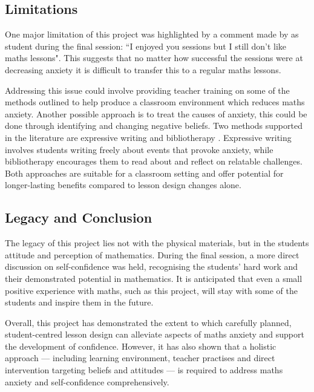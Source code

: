 \documentclass[11pt, a4paper, notitlepage]{article}
\begin{document}
\subsection{Limitations}
One major limitation of this project was highlighted by a comment made by as student during the final session: ``I enjoyed you sessions but I still don't like maths lessons". This suggests that no matter how successful the sessions were at decreasing anxiety it is difficult to transfer this to a regular maths lessons.
\par
 Addressing this issue could involve providing teacher training on some of the methods outlined to help produce a classroom environment which reduces maths anxiety. Another possible approach is to treat the causes of anxiety, this could be done through identifying and changing negative beliefs. Two methods supported in the literature are expressive writing and bibliotherapy \cite{MAES:2024}. Expressive writing involves students writing freely about events that provoke anxiety, while bibliotherapy encourages them to read about and reflect on relatable challenges. Both approaches are suitable for a classroom setting and offer potential for longer-lasting benefits compared to lesson design changes alone.
 

\subsection{Legacy and Conclusion}

The legacy of this project lies not with the physical materials, but in the students attitude and perception of mathematics. During the final session, a more direct discussion on self-confidence was held, recognising the students' hard work and their demonstrated potential in mathematics. It is anticipated that even a small positive experience with maths, such as this project, will stay with some of the students and inspire them in the future.
\par
Overall, this project has demonstrated the extent to which carefully planned, student-centred lesson design can alleviate aspects of maths anxiety and support the development of confidence. However, it has also shown that a holistic approach --- including learning environment, teacher practises and direct intervention targeting beliefs and attitudes --- is required to address maths anxiety and self-confidence comprehensively.




\end{document}
